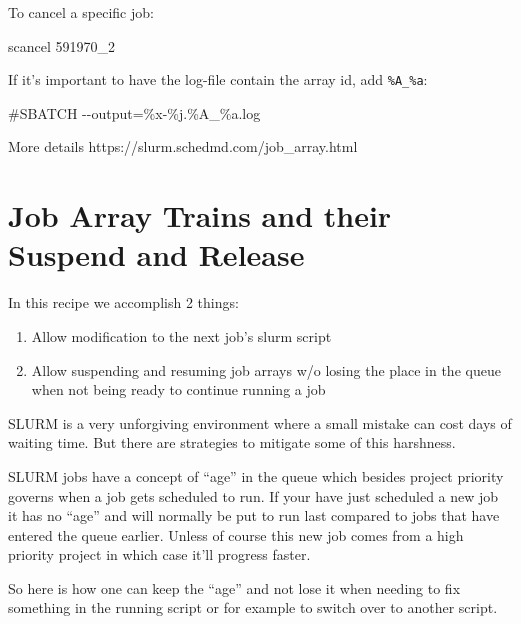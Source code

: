 \documentclass[
]{report}
\newenvironment{Shaded}{\begin{snugshade}}{\end{snugshade}}
\newcommand{\CommentTok}[1]{\textcolor[rgb]{0.37,0.37,0.37}{#1}}
\newcommand{\ExtensionTok}[1]{\textcolor[rgb]{0.00,0.23,0.31}{#1}}
\newcommand{\NormalTok}[1]{\textcolor[rgb]{0.00,0.23,0.31}{#1}}
\providecommand{\tightlist}{%
  \setlength{\itemsep}{0pt}\setlength{\parskip}{0pt}}\usepackage{longtable,booktabs,array}
\begin{document}
To cancel a specific job:

\begin{Shaded}
\begin{Highlighting}[]
\ExtensionTok{scancel}\NormalTok{ 591970\_2}
\end{Highlighting}
\end{Shaded}

If it's important to have the log-file contain the array id, add
\texttt{\%A\_\%a}:

\begin{Shaded}
\begin{Highlighting}[]
\CommentTok{\#SBATCH {-}{-}output=\%x{-}\%j.\%A\_\%a.log}
\end{Highlighting}
\end{Shaded}

More details https://slurm.schedmd.com/job\_array.html

\section{Job Array Trains and their Suspend and
Release}\label{job-array-trains-and-their-suspend-and-release}

In this recipe we accomplish 2 things:

\begin{enumerate}
\def\labelenumi{\arabic{enumi}.}
\tightlist
\item
  Allow modification to the next job's slurm script
\item
  Allow suspending and resuming job arrays w/o losing the place in the
  queue when not being ready to continue running a job
\end{enumerate}

SLURM is a very unforgiving environment where a small mistake can cost
days of waiting time. But there are strategies to mitigate some of this
harshness.

SLURM jobs have a concept of ``age'' in the queue which besides project
priority governs when a job gets scheduled to run. If your have just
scheduled a new job it has no ``age'' and will normally be put to run
last compared to jobs that have entered the queue earlier. Unless of
course this new job comes from a high priority project in which case
it'll progress faster.

So here is how one can keep the ``age'' and not lose it when needing to
fix something in the running script or for example to switch over to
another script.
\end{document}

